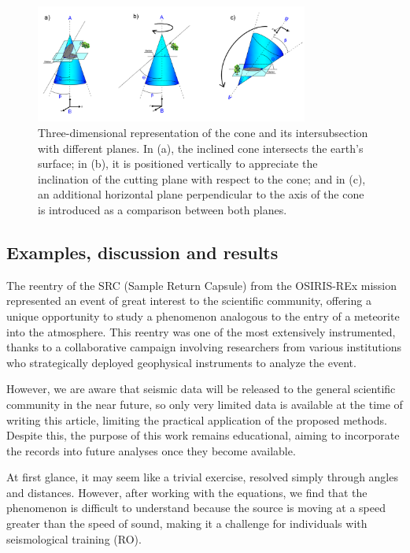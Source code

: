 \documentclass[linenum]{SSA-SRL}
\begin{document}
\begin{flushleft}
\begin{figure}[t] %
    \centering
    \includegraphics[width=0.8\textwidth]{CONOS.PNG} %
    \caption{Three-dimensional representation of the cone and its intersubsection with different planes. In (a), the inclined cone intersects the earth's surface; in (b), it is positioned vertically to appreciate the inclination of the cutting plane with respect to the cone; and in (c), an additional horizontal plane perpendicular to the axis of the cone is introduced as a comparison between both planes.}
    \label{fig:mi_imagen} %
\end{figure}
\end{flushleft}

\subsection{Examples, discussion and results}


The reentry of the SRC (Sample Return Capsule) from the OSIRIS-REx mission represented an event of great interest to the scientific community, offering a unique opportunity to study a phenomenon analogous to the entry of a meteorite into the atmosphere. This reentry was one of the most extensively instrumented, thanks to a collaborative campaign involving researchers from various institutions who strategically deployed geophysical instruments to analyze the event. 

However, we are aware that seismic data will be released to the general scientific community in the near future, so only very limited data is available at the time of writing this article, limiting the practical application of the proposed methods. Despite this, the purpose of this work remains educational, aiming to incorporate the records into future analyses once they become available.

At first glance, it may seem like a trivial exercise, resolved simply through angles and distances. However, after working with the equations, we find that the phenomenon is difficult to understand because the source is moving at a speed greater than the speed of sound, making it a challenge for individuals with seismological training (RO). 
\end{document}
